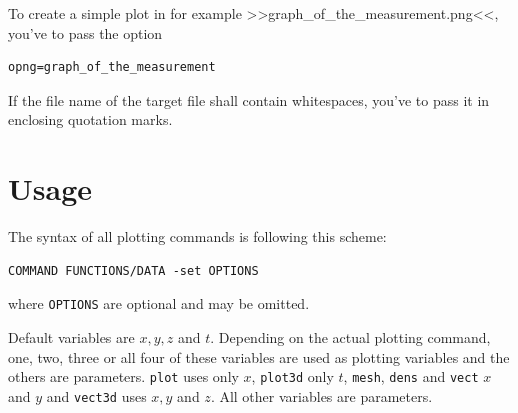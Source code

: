 \documentclass[DIV=14,headsepline,footsepline]{scrbook}
\begin{document}
				To create a simple plot in for example >>graph\_of\_the\_measurement.png<<, you've to pass the option
				\begin{lstlisting}
opng=graph_of_the_measurement
				\end{lstlisting}
				If the file name of the target file shall contain whitespaces, you've to pass it in enclosing quotation marks.
				
			\section{Usage}
				The syntax of all plotting commands is following this scheme:
				\begin{lstlisting}
COMMAND FUNCTIONS/DATA -set OPTIONS
				\end{lstlisting}
				where \lstinline+OPTIONS+ are optional and may be omitted.

				Default variables are $x, y, z$ and $t$. Depending on the actual plotting command, one, two, three or all four of these variables are used as plotting variables and the others are parameters. \lstinline+plot+ uses only $x$, \lstinline+plot3d+ only $t$, \lstinline+mesh+, \lstinline+dens+ and \lstinline+vect+ $x$ and $y$ and \lstinline+vect3d+ uses $x, y$ and $z$. All other variables are parameters.
				
\end{document}
